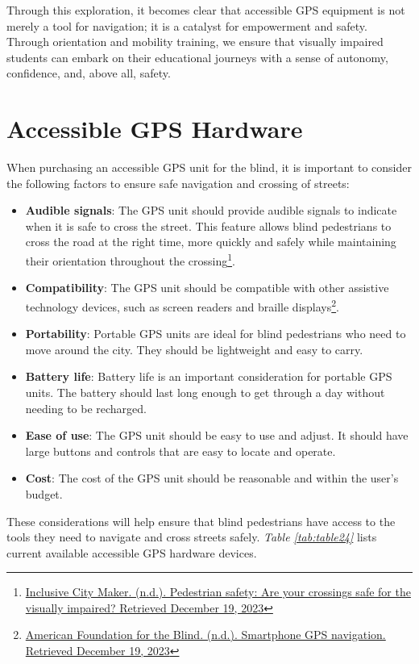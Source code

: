 Through this exploration, it becomes clear that accessible GPS equipment is not merely a tool for navigation; it is a catalyst for empowerment and safety. Through orientation and mobility training, we ensure that visually impaired students can embark on their educational journeys with a sense of autonomy, confidence, and, above all, safety.


\pagebreak \hypertarget{accessible-gps-mapping-hardware}{}\section{Accessible GPS Hardware}\label{accessible-gps-mapping-hardware}
When purchasing an accessible GPS unit for the blind, it is important to consider the following factors to ensure safe navigation and crossing of streets:
\begin{itemize}[leftmargin=*]
 \item \textbf{Audible signals}: The GPS unit should provide audible signals to indicate when it is safe to cross the street. This feature allows blind pedestrians to cross the road at the right time, more quickly and safely while maintaining their orientation throughout the crossing\footnote{\raggedright \href{http://www.inclusivecitymaker.com/pedestrian-safety-visually-impaired-blind-people/}{Inclusive City Maker. (n.d.). Pedestrian safety: Are your crossings safe for the visually impaired? Retrieved December 19, 2023}}.
 \item \textbf{Compatibility}: The GPS unit should be compatible with other assistive technology devices, such as screen readers and braille displays\footnote{\raggedright \href{http://www.afb.org/blindness-and-low-vision/using-technology/smartphone-gps-navigation-people-visual-impairments}{American Foundation for the Blind. (n.d.). Smartphone GPS navigation. Retrieved December 19, 2023}}.
 \item \textbf{Portability}: Portable GPS units are ideal for blind pedestrians who need to move around the city. They should be lightweight and easy to carry.
 \item \textbf{Battery life}: Battery life is an important consideration for portable GPS units. The battery should last long enough to get through a day without needing to be recharged.
 \item \textbf{Ease of use}: The GPS unit should be easy to use and adjust. It should have large buttons and controls that are easy to locate and operate.
 \item \textbf{Cost}: The cost of the GPS unit should be reasonable and within the user’s budget.
\end{itemize}
These considerations will help ensure that blind pedestrians have access to the tools they need to navigate and cross streets safely. \textit{Table \ref{tab:table24}} lists current available accessible GPS hardware devices.

